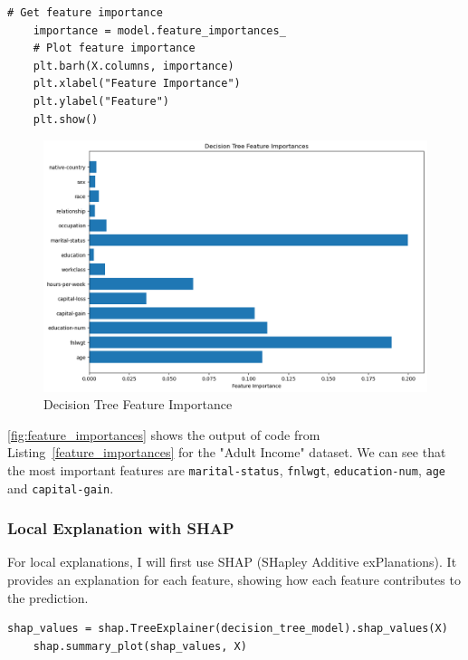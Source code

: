 \documentclass[10pt,journal,compsoc]{IEEEtran}
\begin{document}
\begin{lstlisting}[caption=Feature Importance, label=feature_importances]
    # Get feature importance
    importance = model.feature_importances_
    # Plot feature importance
    plt.barh(X.columns, importance)
    plt.xlabel("Feature Importance")
    plt.ylabel("Feature")
    plt.show()    
\end{lstlisting}

\begin{figure}[H]
    \centering
    \includegraphics[width=1\linewidth]{images/feature_importance_global.png}    
    \caption{Decision Tree Feature Importance}
    \label{fig:feature_importances}
\end{figure}

\autoref{fig:feature_importances} shows the output of code from Listing~\ref{feature_importances} for the "Adult Income" dataset. We can see that the most important features are \texttt{marital-status}, \texttt{fnlwgt}, \texttt{education-num}, \texttt{age} and \texttt{capital-gain}.


\subsubsection{Local Explanation with SHAP}
For local explanations, I will first use SHAP (SHapley Additive exPlanations). It provides an explanation for each feature, showing how each feature contributes to the prediction. 

\begin{lstlisting}[caption=SHAP Explainer , label=shap_explainer]
    shap_values = shap.TreeExplainer(decision_tree_model).shap_values(X)
    shap.summary_plot(shap_values, X)
\end{lstlisting}
\end{document}
